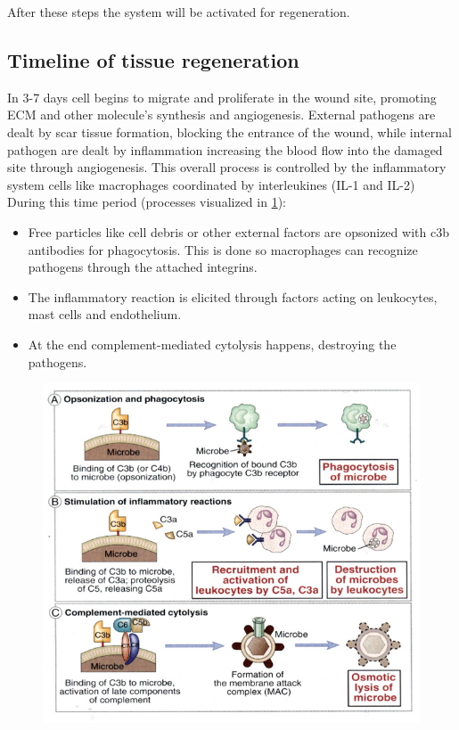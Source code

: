 After these steps the system will be activated for regeneration.

	\subsection{Timeline of tissue regeneration}
	In 3-7 days cell begins to migrate and proliferate in the wound site, promoting ECM and other molecule's synthesis and angiogenesis.
	External pathogens are dealt by scar tissue formation, blocking the entrance of the wound, while internal pathogen are dealt by inflammation increasing the blood flow into the damaged site through angiogenesis.
	This overall process is controlled by the inflammatory system cells like macrophages coordinated by interleukines (IL-1 and IL-2)
	During this time period (processes visualized in \ref{fig:roles}):

	\begin{multicols}{2}
		\begin{itemize}
			\item Free particles like cell debris or other external factors are opsonized with c3b antibodies for phagocytosis.
				This is done so macrophages can recognize pathogens through the attached integrins.
			\item The inflammatory reaction is elicited through factors acting on leukocytes, mast cells and endothelium.
			\item At the end complement-mediated cytolysis happens, destroying the pathogens.
		\end{itemize}
	\end{multicols}

	\begin{figure}[ht]
		\centering
		\includegraphics[width=\textwidth]{roles}
		\caption{\label{fig:roles}}
	\end{figure}


